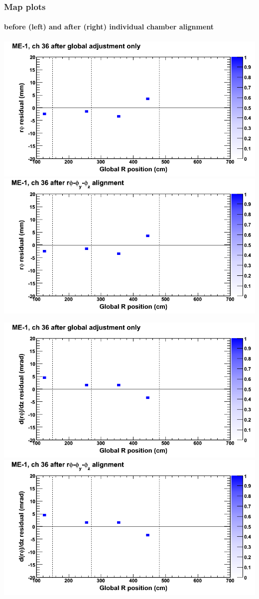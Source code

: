 \documentclass[compress]{beamer}
\begin{document}
\begin{frame}
\frametitle{Map plots}
\framesubtitle{before (left) and after (right) individual chamber alignment}
\includegraphics[width=0.5\linewidth]{ringmapplots_3dof/before_CSCvsr_mem1ch36_x.png} \includegraphics[width=0.5\linewidth]{ringmapplots_3dof/after_CSCvsr_mem1ch36_x.png}

\includegraphics[width=0.5\linewidth]{ringmapplots_3dof/before_CSCvsr_mem1ch36_dxdz.png} \includegraphics[width=0.5\linewidth]{ringmapplots_3dof/after_CSCvsr_mem1ch36_dxdz.png}
\end{frame}
\end{document}
